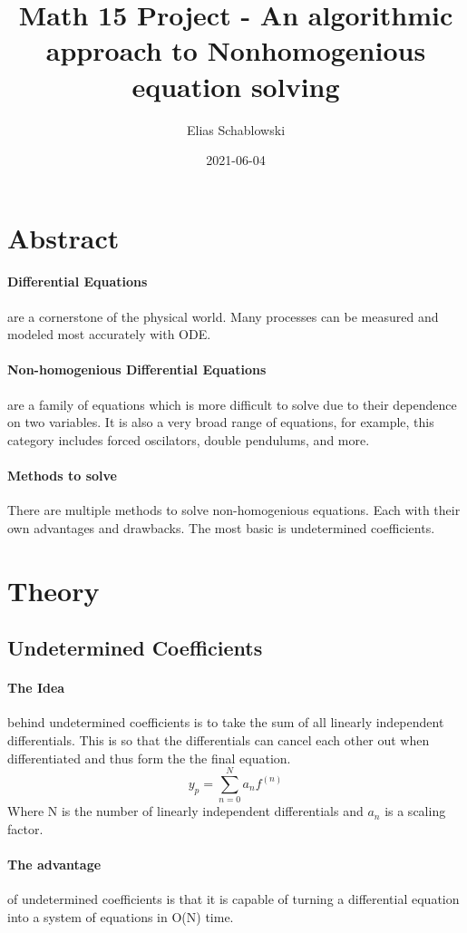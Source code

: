 \documentclass{article}
\title{Math 15 Project - An algorithmic approach to Nonhomogenious equation solving}
\date{2021-06-04}
\author{Elias Schablowski}
\begin{document}
\maketitle
\newpage
\tableofcontents
\pagebreak
{}
\section{Abstract}
\paragraph{Differential Equations} are a cornerstone of the physical world. Many processes can be measured and modeled most accurately with ODE.
\paragraph{Non-homogenious Differential Equations} are a family of equations which is more difficult to solve due to their dependence on two variables. It is also a very broad range of equations, for example, this category includes forced oscilators, double pendulums, and more.
\paragraph{Methods to solve} There are multiple methods to solve non-homogenious equations. Each with their own advantages and drawbacks. The most basic is undetermined coefficients.
\section{Theory}

\subsection{Undetermined Coefficients}
\paragraph{The Idea} behind undetermined coefficients is to take the sum of all linearly independent differentials. This is so that the differentials can cancel each other out when differentiated and thus form the the final equation.
$$y_p=\sum_{n=0}^Na_n f^{(n)}$$ Where N is the number of linearly independent differentials and $a_n$ is a scaling factor.
\paragraph{The advantage} of undetermined coefficients is that it is capable of turning a differential equation into a system of equations in O(N) time.
\end{document}
